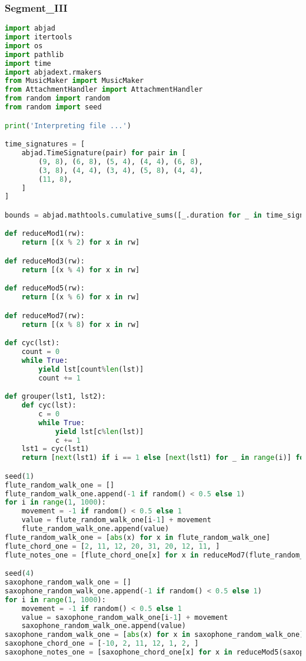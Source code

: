 \subsubsection{Segment\_III}
\singlespace
\begin{lstlisting}[language=Python, caption=Four Ages of Sand Segment\_III]
import abjad
import itertools
import os
import pathlib
import time
import abjadext.rmakers
from MusicMaker import MusicMaker
from AttachmentHandler import AttachmentHandler
from random import random
from random import seed

print('Interpreting file ...')

time_signatures = [
    abjad.TimeSignature(pair) for pair in [
        (9, 8), (6, 8), (5, 4), (4, 4), (6, 8),
        (3, 8), (4, 4), (3, 4), (5, 8), (4, 4),
        (11, 8),
    ]
]

bounds = abjad.mathtools.cumulative_sums([_.duration for _ in time_signatures])

def reduceMod1(rw):
    return [(x % 2) for x in rw]

def reduceMod3(rw):
    return [(x % 4) for x in rw]

def reduceMod5(rw):
    return [(x % 6) for x in rw]

def reduceMod7(rw):
    return [(x % 8) for x in rw]

def cyc(lst):
    count = 0
    while True:
        yield lst[count%len(lst)]
        count += 1

def grouper(lst1, lst2):
    def cyc(lst):
        c = 0
        while True:
            yield lst[c%len(lst)]
            c += 1
    lst1 = cyc(lst1)
    return [next(lst1) if i == 1 else [next(lst1) for _ in range(i)] for i in lst2]

seed(1)
flute_random_walk_one = []
flute_random_walk_one.append(-1 if random() < 0.5 else 1)
for i in range(1, 1000):
    movement = -1 if random() < 0.5 else 1
    value = flute_random_walk_one[i-1] + movement
    flute_random_walk_one.append(value)
flute_random_walk_one = [abs(x) for x in flute_random_walk_one]
flute_chord_one = [2, 11, 12, 20, 31, 20, 12, 11, ]
flute_notes_one = [flute_chord_one[x] for x in reduceMod7(flute_random_walk_one)]

seed(4)
saxophone_random_walk_one = []
saxophone_random_walk_one.append(-1 if random() < 0.5 else 1)
for i in range(1, 1000):
    movement = -1 if random() < 0.5 else 1
    value = saxophone_random_walk_one[i-1] + movement
    saxophone_random_walk_one.append(value)
saxophone_random_walk_one = [abs(x) for x in saxophone_random_walk_one]
saxophone_chord_one = [-10, 2, 11, 12, 1, 2, ]
saxophone_notes_one = [saxophone_chord_one[x] for x in reduceMod5(saxophone_random_walk_one)]


\end{lstlisting}
